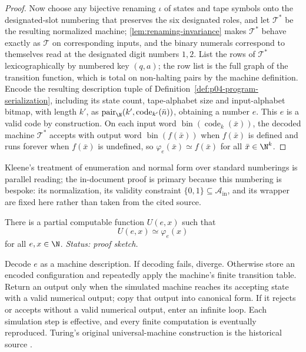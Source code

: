 \begin{proof}
Now choose any bijective renaming \(\iota\) of states and tape symbols onto
the designated-slot numbering that preserves the six designated roles, and
let \(\mathcal T^*\) be the resulting normalized machine;
\cref{lem:renaming-invariance} makes \(\mathcal T^*\) behave exactly as
\(\mathcal T\) on corresponding inputs, and the binary numerals correspond
to themselves read at the designated digit numbers \(1,2\).  List the rows
of \(\mathcal T^*\) lexicographically by numbered key \((q,a)\); the row
list is the full graph of the transition function, which is total on
non-halting pairs by the machine definition.  Encode the resulting
description tuple of Definition~\ref{def:p04-program-serialization},
including its state count, tape-alphabet size and input-alphabet bitmap,
with length \(k'\), as
\(\operatorname{pair}_{\N}(k',\operatorname{code}_{k'}(\bar n))\), obtaining
a number \(e\).  This \(e\) is a valid code by construction.  On each input
word \(\operatorname{bin}(\operatorname{code}_k(\bar x))\), the decoded
machine \(\mathcal T^*\) accepts with output word
\(\operatorname{bin}(f(\bar x))\) when \(f(\bar x)\) is defined and runs
forever when \(f(\bar x)\) is undefined, so
\(\varphi_e(\bar x)\simeq f(\bar x)\) for all \(\bar x\in\N^k\).
\end{proof}

Kleene's treatment of enumeration and normal form over standard numberings
\cite{Kleene1952} is parallel reading; the in-document proof is primary
because this numbering is bespoke: its normalization, its validity
constraint \(\{0,1\}\subseteq\mathcal A_{\mathrm{in}}\), and its wrapper are
fixed here rather than taken from the cited source.

\begin{theorem}
\label{thm:universal-computation}
There is a partial computable function \(U(e,x)\) such that
\[
  U(e,x)\simeq\varphi_e(x)
\]
for all \(e,x\in\N\).
\textit{Status: proof sketch.}
\end{theorem}

\begin{proofplan}
Decode \(e\) as a machine description.  If decoding fails, diverge.  Otherwise
store an encoded configuration and repeatedly apply the machine's finite
 transition table.  Return an output only when the simulated machine reaches
its accepting state with a valid numerical output; copy that output into
canonical form.  If it rejects or accepts without a valid numerical output,
enter an
 infinite loop.  Each simulation step is effective, and every finite computation is
eventually reproduced.  Turing's original universal-machine construction is
the historical source \cite{Turing1937}.
\end{proofplan}

